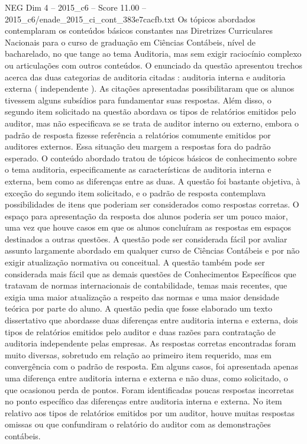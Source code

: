 \begin{textsample}{NEG Dim 4 – 2015\_c6 – Score 11.00 – 2015\_c6/enade\_2015\_ci\_cont\_383e7cacfb.txt}
Os tópicos abordados contemplaram os conteúdos básicos constantes nas Diretrizes Curriculares Nacionais para o curso de graduação em Ciências Contábeis, nível de bacharelado, no que tange ao tema Auditoria, mas sem exigir raciocínio complexo ou articulações com outros conteúdos.
O enunciado da questão apresentou trechos acerca das duas categorias de auditoria citadas : auditoria interna e auditoria externa ( independente ).
As citações apresentadas possibilitaram que os alunos tivessem alguns subsídios para fundamentar suas respostas.
Além disso, o segundo item solicitado na questão abordava os tipos de relatórios emitidos pelo auditor, mas não especificava se se trata de auditor interno ou externo, embora o padrão de resposta fizesse referência a relatórios comumente emitidos por auditores externos.
Essa situação deu margem a respostas fora do padrão esperado.
O conteúdo abordado tratou de tópicos básicos de conhecimento sobre o tema auditoria, especificamente as características de auditoria interna e externa, bem como as diferenças entre as duas.
A questão foi bastante objetiva, à exceção do segundo item solicitado, e o padrão de resposta contemplava possibilidades de itens que poderiam ser considerados como respostas corretas.
O espaço para apresentação da resposta dos alunos poderia ser um pouco maior, uma vez que houve casos em que os alunos concluíram as respostas em espaços destinados a outras questões.
A questão pode ser considerada fácil por avaliar assunto largamente abordado em qualquer curso de Ciências Contábeis e por não exigir atualização normativa ou conceitual.
A questão também pode ser considerada mais fácil que as demais questões de Conhecimentos Específicos que tratavam de normas internacionais de contabilidade, temas mais recentes, que exigia uma maior atualização a respeito das normas e uma maior densidade teórica por parte do aluno.
A questão pedia que fosse elaborado um texto dissertativo que abordasse duas diferenças entre auditoria interna e externa, dois tipos de relatórios emitidos pelo auditor e duas razões para contratação de auditoria independente pelas empresas.
As respostas corretas encontradas foram muito diversas, sobretudo em relação ao primeiro item requerido, mas em convergência com o padrão de resposta.
Em alguns casos, foi apresentada apenas uma diferença entre auditoria interna e externa e não duas, como solicitado, o que ocasionou perda de pontos.
Foram identificadas poucas respostas incorretas no ponto específico das diferenças entre auditoria interna e externa.
No item relativo aos tipos de relatórios emitidos por um auditor, houve muitas respostas omissas ou que confundiram o relatório do auditor com as demonstrações contábeis.

\end{textsample}
